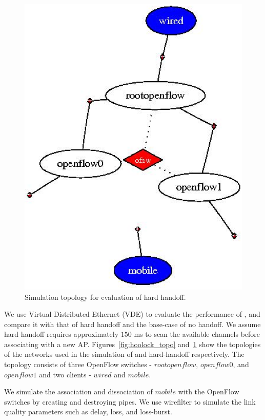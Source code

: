 \begin{figure}[htb!]
\begin{minipage}[t]{0.45\textwidth}
\centerline{\includegraphics[width=\columnwidth]{fig/hard_handover}}
\caption{Simulation topology for evaluation of hard handoff.}
\label{fig:hard_topo}
\end{minipage}
\hfill
\end{figure}

We use Virtual Distributed Ethernet (VDE) to evaluate the performance of \sys, 
and compare it with that of hard handoff and the base-case of no handoff.
We assume hard handoff requires approximately $150$ ms to scan the available 
channels before associating with a new AP.
Figures~\ref{fig:hoolock_topo} and~\ref{fig:hard_topo} show the topologies of 
the networks used in the simulation of \sys{} and hard-handoff respectively. 
The topology consists of three OpenFlow switches - $rootopenflow$, $openflow0$, and $openflow1$ 
and two clients - $wired$ and $mobile$.

We simulate the association and dissociation of $mobile$ with the OpenFlow switches by
creating and destroying pipes. We use wirefilter to simulate the link quality parameters
such as delay, loss, and loss-burst.


